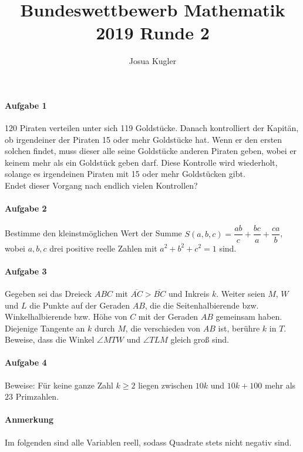 \documentclass{article}
\title{Bundeswettbewerb Mathematik 2019 Runde 2}
\author{Josua Kugler}
\begin{document}
	\maketitle
	\paragraph*{Aufgabe 1} 120 Piraten verteilen unter sich 119 Goldstücke. Danach kontrolliert der Kapitän, ob irgendeiner der Piraten 15 oder mehr Goldstücke hat. Wenn er den ersten solchen findet, muss dieser alle seine Goldstücke anderen Piraten geben, wobei er keinem mehr als ein Goldstück geben darf. Diese Kontrolle wird wiederholt, solange es irgendeinen Piraten mit 15 oder mehr Goldstücken gibt.\\
	Endet dieser Vorgang nach endlich vielen Kontrollen?
	\paragraph*{Aufgabe 2} Bestimme den kleinstmöglichen Wert der Summe $S(a,b,c) = \dfrac{ab}{c} + \dfrac{bc}{a} + \dfrac{ca}{b}$, wobei $a, b, c$ drei positive reelle Zahlen mit $a^2 + b^2 + c^2 = 1$ sind.
	\paragraph*{Aufgabe 3} Gegeben sei das Dreieck $ABC$ mit $\overline{AC}>\overline{BC}$ und Inkreis $k$. Weiter seien $M$, $W$ und $L$ die Punkte auf der Geraden $AB$, die die Seitenhalbierende bzw. Winkelhalbierende bzw. Höhe von $C$ mit der Geraden $AB$ gemeinsam haben. Diejenige Tangente an $k$ durch $M$, die verschieden von $AB$ ist, berühre $k$ in $T$.\\
	Beweise, dass die Winkel $\angle MTW$ und $\angle TLM$ gleich groß sind.
	\paragraph*{Aufgabe 4} Beweise: Für keine ganze Zahl $k\geq 2$ liegen zwischen $10k$ und $10k+100$ mehr als $23$ Primzahlen.
	\paragraph*{Anmerkung} Im folgenden sind alle Variablen reell, sodass Quadrate stets nicht negativ sind.
	\newpage
\end{document}
